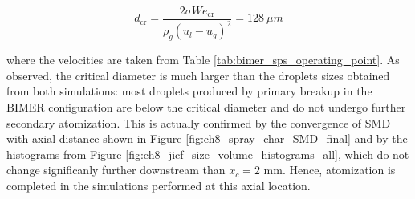 \begin{equation}
d_\mathrm{cr} = \frac{2 \sigma We_\mathrm{cr}}{\rho_g \left( u_l - u_g \right)^2} = 128 ~\mu m
\end{equation}

where the velocities are taken from Table \ref{tab:bimer_sps_operating_point}. As observed, the critical diameter is much larger than the droplets sizes obtained from both simulations: most droplets produced by primary breakup in the BIMER configuration are below the critical diameter and do not undergo further secondary atomization. This is actually confirmed by the convergence of SMD with axial distance shown in Figure \ref{fig:ch8_spray_char_SMD_final} and by the histograms from Figure \ref{fig:ch8_jicf_size_volume_histograms_all}, which do not change significanly further downstream than $x_c = 2$ mm. Hence, atomization is completed in the simulations performed at this axial location. 







